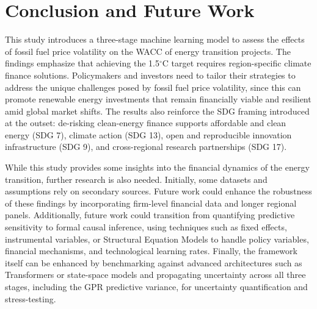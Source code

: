 \section{Conclusion and Future Work}

This study introduces a three-stage machine learning model to assess the effects of fossil fuel price volatility on the WACC of energy transition projects. The findings emphasize that achieving the 1.5$^\circ$C target requires region-specific climate finance solutions. Policymakers and investors need to tailor their strategies to address the unique challenges posed by fossil fuel price volatility, since this can promote renewable energy investments that remain financially viable and resilient amid global market shifts. The results also reinforce the SDG framing introduced at the outset: de-risking clean-energy finance supports affordable and clean energy (SDG 7), climate action (SDG 13), open and reproducible innovation infrastructure (SDG 9), and cross-regional research partnerships (SDG 17).

While this study provides some insights into the financial dynamics of the energy transition, further research is also needed. Initially, some datasets and assumptions rely on secondary sources. Future work could enhance the robustness of these findings by incorporating firm-level financial data and longer regional panels. Additionally, future work could transition from quantifying predictive sensitivity to formal causal inference, using techniques such as fixed effects, instrumental variables, or Structural Equation Models to handle policy variables, financial mechanisms, and technological learning rates. Finally, the framework itself can be enhanced by benchmarking against advanced architectures such as Transformers or state-space models and propagating uncertainty across all three stages, including the GPR predictive variance, for uncertainty quantification and stress-testing.
